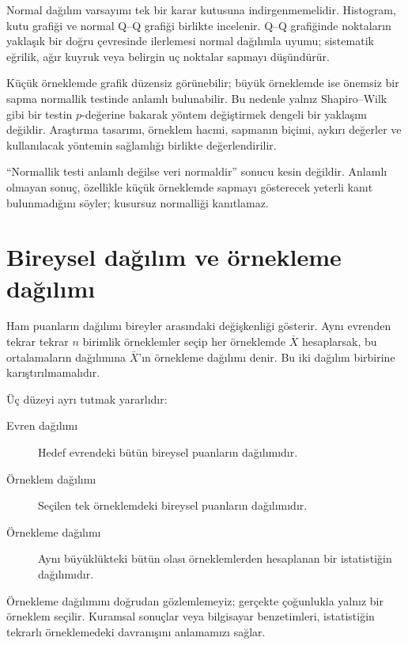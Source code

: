Normal dağılım varsayımı tek bir karar kutusuna indirgenmemelidir. Histogram,
kutu grafiği ve normal Q--Q grafiği birlikte incelenir. Q--Q grafiğinde
noktaların yaklaşık bir doğru çevresinde ilerlemesi normal dağılımla uyumu;
sistematik eğrilik, ağır kuyruk veya belirgin uç noktalar sapmayı düşündürür.

Küçük örneklemde grafik düzensiz görünebilir; büyük örneklemde ise önemsiz bir
sapma normallik testinde anlamlı bulunabilir. Bu nedenle yalnız Shapiro--Wilk
gibi bir testin $p$-değerine bakarak yöntem değiştirmek dengeli bir yaklaşım
değildir. Araştırma tasarımı, örneklem hacmi, sapmanın biçimi, aykırı değerler
ve kullanılacak yöntemin sağlamlığı birlikte değerlendirilir.

\begin{mistakebox}
``Normallik testi anlamlı değilse veri normaldir'' sonucu kesin değildir.
Anlamlı olmayan sonuç, özellikle küçük örneklemde sapmayı gösterecek yeterli
kanıt bulunmadığını söyler; kusursuz normalliği kanıtlamaz.
\end{mistakebox}

\section{Bireysel dağılım ve örnekleme dağılımı}

Ham puanların dağılımı bireyler arasındaki değişkenliği gösterir. Aynı evrenden
tekrar tekrar $n$ birimlik örneklemler seçip her örneklemde $\bar X$
hesaplarsak, bu ortalamaların dağılımına $\bar X$'ın örnekleme dağılımı denir.
Bu iki dağılım birbirine karıştırılmamalıdır.

Üç düzeyi ayrı tutmak yararlıdır:

\begin{description}
  \item[Evren dağılımı] Hedef evrendeki bütün bireysel puanların dağılımıdır.
  \item[Örneklem dağılımı] Seçilen tek örneklemdeki bireysel puanların dağılımıdır.
  \item[Örnekleme dağılımı] Aynı büyüklükteki bütün olası örneklemlerden hesaplanan bir istatistiğin dağılımıdır.
\end{description}

Örnekleme dağılımını doğrudan gözlemlemeyiz; gerçekte çoğunlukla yalnız bir
örneklem seçilir. Kuramsal sonuçlar veya bilgisayar benzetimleri, istatistiğin
tekrarlı örneklemedeki davranışını anlamamızı sağlar.

